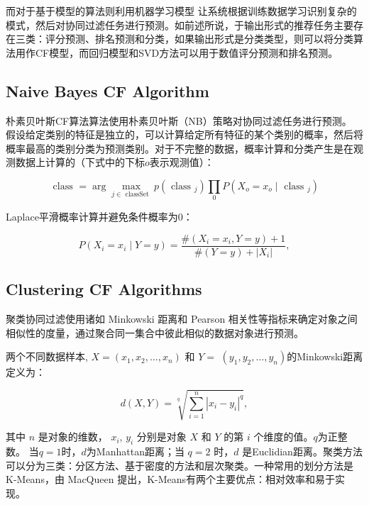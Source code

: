 \documentclass[sigconf]{acmart}
\begin{document}
而对于基于模型的算法则利用机器学习模型\cite{billsus1998learning,breese2013empirical, getoor1999using, goldberg2001eigentaste, hofmann2003collaborative, marlin2003modeling, pavlov2002maximum, ungar1998clustering} 让系统根据训练数据学习识别复杂的模式，然后对协同过滤任务进行预测。如前述所说，于输出形式的推荐任务主要存在三类：评分预测、排名预测和分类，如果输出形式是分类类型，则可以将分类算法用作CF模型，而回归模型和SVD方法可以用于数值评分预测和排名预测。

\subsection{Naive Bayes CF Algorithm}

朴素贝叶斯CF算法算法使用朴素贝叶斯（NB）策略对协同过滤任务进行预测。 假设给定类别的特征是独立的，可以计算给定所有特征的某个类别的概率，然后将概率最高的类别分类为预测类别\cite{miyahara2002improvement}。对于不完整的数据，概率计算和分类产生是在观测数据上计算的（下式中的下标$o$表示观测值）：

\begin{equation}
  \text { class }=\arg\max_{j \in \text { classSet }} p\left(\text { class }_{j}\right) \prod_{0} P\left(X_{o}=x_{o} \mid \text { class }_{j}\right)  
\end{equation}

Laplace平滑概率计算并避免条件概率为0：

\begin{equation}
  P\left(X_{i}=x_{i} \mid Y=y\right)=\frac{\#\left(X_{i}=x_{i}, Y=y\right)+1}{\#(Y=y)+\left|X_{i}\right|},
\end{equation}

\subsection{Clustering CF Algorithms}

聚类协同过滤使用诸如 Minkowski 距离和 Pearson 相关性等指标来确定对象之间相似性的度量，通过聚合同一集合中彼此相似的数据对象进行预测。

两个不同数据样本, $X=\left(x_{1}, x_{2}, \ldots, x_{n}\right)$ 和 $Y=$ $\left(y_{1}, y_{2}, \ldots, y_{n}\right)$的Minkowski距离定义为：

\begin{equation}
  d(X, Y)=\sqrt[q]{\sum_{i=1}^{n}\left|x_{i}-y_{i}\right|^{q}},  
\end{equation}

其中 $n$ 是对象的维数， $x_i$, $y_i$ 分别是对象 $X$ 和 $Y$ 的第 $i$ 个维度的值。$q$为正整数。 当$q = 1$时，$d$为Manhattan距离；当 $q = 2$ 时，$d$ 是Euclidian距离。聚类方法可以分为三类：分区方法、基于密度的方法和层次聚类。一种常用的划分方法是 K-Means，由 MacQueen \cite{macqueen1967some} 提出，K-Means有两个主要优点：相对效率和易于实现。
\end{document}
